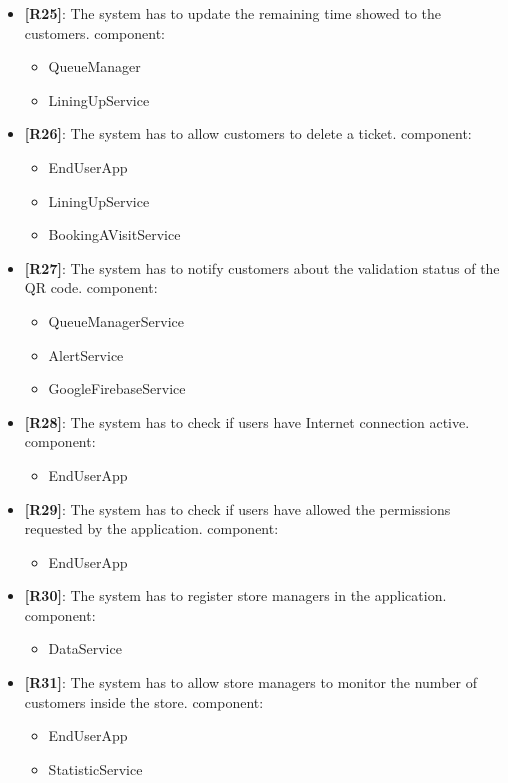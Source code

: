 \begin{itemize}
\begin{itemize}
	\end{itemize}
	\item {\textbf{[R25]}}: The system has to update the remaining time showed to the customers.
component:
	\begin{itemize}
	\item QueueManager 
	\item LiningUpService
	\end{itemize}
	\item {\textbf{[R26]}}: The system has to allow customers to delete a ticket.
component:
	\begin{itemize}
	\item EndUserApp 
	\item LiningUpService
	\item BookingAVisitService  
	\end{itemize}
	\item {\textbf{[R27]}}: The system has to notify customers about the validation status of the QR code.
component:
	\begin{itemize}
	\item QueueManagerService 
	\item AlertService 
	\item GoogleFirebaseService   
	\end{itemize}
	\item {\textbf{[R28]}}: The system has to check if users have Internet connection active.
component:
	\begin{itemize}
	\item EndUserApp
	\end{itemize}
	\item {\textbf{[R29]}}: The system has to check if users have allowed the permissions requested by the application.
component:
	\begin{itemize}
	\item EndUserApp
	\end{itemize}
	\item {\textbf{[R30]}}: The system has to register store managers in the application.
component:
	\begin{itemize}
	\item DataService 
	\end{itemize}
	\item {\textbf{[R31]}}: The system has to allow store managers to monitor the number of customers inside the store.
component:
	\begin{itemize}
	\item EndUserApp 
	\item StatisticService 

\end{itemize}
\end{itemize}
